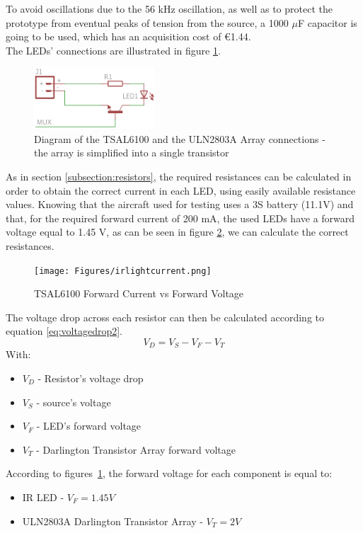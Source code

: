To avoid oscillations due to the 56 kHz oscillation, as well as to protect the prototype from eventual peaks of tension from the source, a 1000 $\mu$F capacitor is going to be used, which has an acquisition cost of \euro{1.44}.\\

The LEDs' connections are illustrated in figure \ref{fig:IRlight}.\\
\begin{figure}[!htb]
  \centering
  \includegraphics[width=0.4\textwidth]{Figures/EsquemasLights/IRlight.png}
  \caption[Diagram of the TSAL6100 and the ULN2803A Array connections]{Diagram of the TSAL6100 and the ULN2803A Array connections - the array is simplified into a single transistor}
  \label{fig:IRlight}
\end{figure}

As in section \ref{subsection:resistors}, the required resistances can be calculated in order to obtain the correct current in each LED, using easily available resistance values. Knowing that the aircraft used for testing uses a 3S battery (11.1V) and that, for the required forward current of 200 mA, the used LEDs have a forward voltage equal to 1.45 V, as can be seen in figure \ref{fig:irlightcurrent}, we can calculate the correct resistances.\\
\begin{figure}[!htb]
  \centering
  \texttt{[image: Figures/irlightcurrent.png]}
  \caption[TSAL6100 Forward Current vs Forward Voltage \citep{Vishay2014}]{TSAL6100 Forward Current vs Forward Voltage \citep{Vishay2014}}
  \label{fig:irlightcurrent}
\end{figure}

The voltage drop across each resistor can then be calculated according to equation \eqref{eq:voltagedrop2}.
\begin{equation}\label{eq:voltagedrop2}
V_{D}=V_{S}-V_{F}-V_{T}
\end{equation}
With:
\begin{itemize}
\item $V_{D}$ - Resistor's voltage drop
\item $V_{S}$ - source's voltage
\item $V_{F}$ - LED's forward voltage 
\item $V_{T}$ - Darlington Transistor Array forward voltage
\end{itemize}
According to figures~\ref{fig:IRlight}, the forward voltage for each component is equal to:
\begin{itemize}
\item IR LED - $V_{F} = 1.45 V$
\item ULN2803A Darlington Transistor Array - $V_{T} = 2 V$
\end{itemize}

